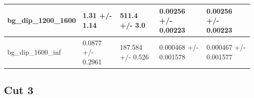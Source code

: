 \documentclass[a4paper, 10pt]{article}
\begin{document}
\begin{table}[H]
\begin{center}
\begin{tabular}{|m{20.0mm}|m{27.0mm}|m{27.0mm}|m{33.0mm}|m{32.0mm}|}
      \hline
      {\cellcolor{white}         bg\_dip\_1200\_1600}& {\cellcolor{white}         1.31 +/\-- 1.14}& {\cellcolor{white}         511.4 +/\-- 3.0}& {\cellcolor{white}         0.00256 +/\-- 0.00223}& {\cellcolor{white}         0.00256 +/\-- 0.00223}\\
      \hline
      {\cellcolor{white}         bg\_dip\_1600\_inf}& {\cellcolor{white}         0.0877 +/\-- 0.2961}& {\cellcolor{white}         187.584 +/\-- 0.526}& {\cellcolor{white}         0.000468 +/\-- 0.001578}& {\cellcolor{white}         0.000467 +/\-- 0.001577}\\
\hline
    \end{tabular}
  \end{center}
\end{table}

   \newpage
\subsection{Cut 3}
\end{document}
